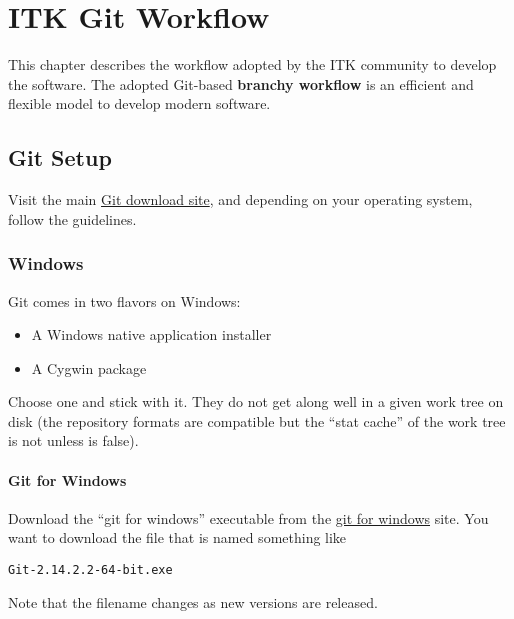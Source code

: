 \chapter{ITK Git Workflow}
\label{ch:ITKGitWorkflow}

This chapter describes the workflow adopted by the ITK community to develop
the software. The adopted Git-based \textbf{branchy workflow} is an efficient
and flexible model to develop modern software.


\section{Git Setup}
\label{sec:Git Setup}

Visit the main \href{http://www.git-scm.com/download}{Git download site}, and
depending on your operating system, follow the guidelines.


\subsection{Windows}
\label{subsec:Windows}

Git comes in two flavors on Windows:

\begin{itemize}
\item A Windows native application installer
\item A Cygwin package
\end{itemize}

Choose one and stick with it. They do not get along well in a given work tree
on disk (the repository formats are compatible but the ``stat cache'' of the
work tree is not unless  is false).


\subsubsection{Git for Windows}
\label{subsubsec:GitForWindows}

Download the ``git for windows'' executable from the
\href{https://git-for-windows.github.io/}{git for windows} site. You want to
download the file that is named something like

\begin{verbatim}
Git-2.14.2.2-64-bit.exe
\end{verbatim}

Note that the filename changes as new versions are released.

